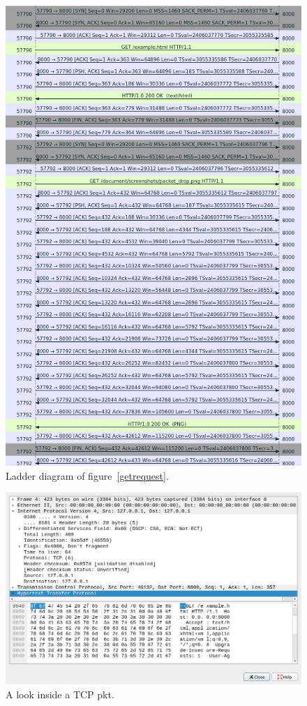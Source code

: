 \documentclass[titlepage]{article}
\begin{document}
\begin{figure}[H]
  \centering
  \includegraphics[width=\textwidth]{screenshots/website_get_ladder.png}
  \caption{%
    Ladder diagram of figure~\ref{getrequest}.
  }\label{getrequestladder}
\end{figure}

\begin{figure}[H]
  \centering
  \includegraphics[width=\textwidth]{screenshots/deconstructed_packet.png}
  \caption{%
    A look inside a TCP \gls{pkt}.
  }\label{deconstructed}
\end{figure}
\end{document}
